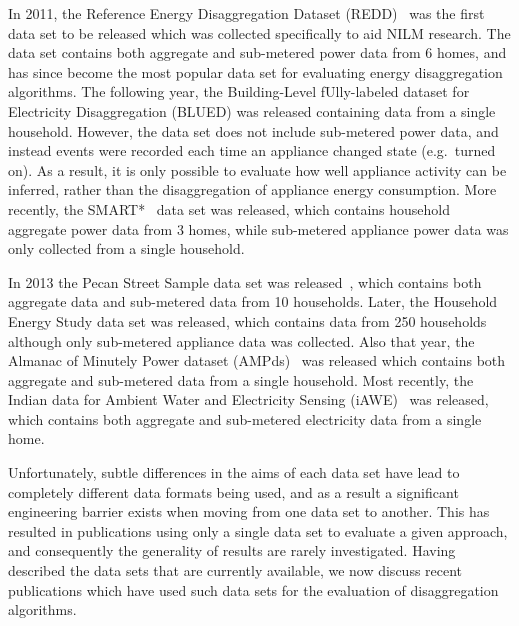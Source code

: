 \documentclass{sig-alternate}
\begin{document}
In 2011, the Reference Energy Disaggregation Dataset (REDD)~\cite{redd} was the first data set to be released which was collected specifically to aid NILM research. The data set contains both aggregate and sub-metered power data from 6 homes, and has since become the most popular data set for evaluating energy disaggregation algorithms. The following year, the Building-Level fUlly-labeled dataset for Electricity Disaggregation (BLUED) was released containing data from a single household. However, the data set does not include sub-metered power data, and instead events were recorded each time an appliance changed state (e.g.\ turned on). As a result, it is only possible to evaluate how well appliance activity can be inferred, rather than the disaggregation of appliance energy consumption. More recently, the SMART*~\cite{smart} data set was released, which contains household aggregate power data from 3 homes, while sub-metered appliance power data was only collected from a single household.

In 2013 the Pecan Street Sample data set was released~\cite{pecan}, which contains both aggregate data and sub-metered data from 10 households. Later, the Household Energy Study data set was released, which contains data from 250 households although only sub-metered appliance data was collected. Also that year, the Almanac of Minutely Power dataset (AMPds)~\cite{ampds} was released which contains both aggregate and sub-metered data from a single household. Most recently, the Indian data for Ambient Water and Electricity Sensing (iAWE)~\cite{iawe} was released, which contains both aggregate and sub-metered electricity data from a single home.

Unfortunately, subtle differences in the aims of each data set have lead to completely different data formats being used, and as a result a significant engineering barrier exists when moving from one data set to another. This has resulted in publications using only a single data set to evaluate a given approach, and consequently the generality of results are rarely investigated. Having described the data sets that are currently available, we now discuss recent publications which have used such data sets for the evaluation of disaggregation algorithms.
\end{document}
